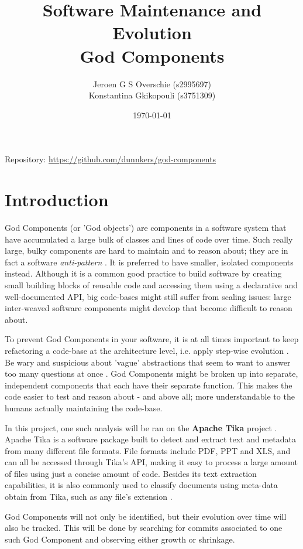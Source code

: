 \documentclass{article}
\title{Software Maintenance and Evolution \\God Components}
\author{Jeroen G S Overschie (s2995697)\\ Konstantina Gkikopouli (s3751309)}
\date{\today}
\begin{document}
\maketitle
Repository: \small{\url{https://github.com/dunnkers/god-components}}
\tableofcontents
\newpage

\section{Introduction}
God Components (or 'God objects') are components in a software system that have accumulated a large bulk of classes and lines of code over time. Such really large, bulky components are hard to maintain and to reason about; they are in fact a software \textit{anti-pattern} \citep{smith2000software}. It is preferred to have smaller, isolated components instead. Although it is a common good practice to build software by creating small building blocks of reusable code and accessing them using a declarative and well-documented API, big code-bases might still suffer from scaling issues: large inter-weaved software components might develop that become difficult to reason about.

To prevent God Components in your software, it is at all times important to keep refactoring a code-base at the architecture level, i.e. apply step-wise evolution \citep{toward_a_catalogue_of_architetural_bad_smells}. Be wary and suspicious about 'vague' abstractions that seem to want to answer too many questions at once \citep{riel1996object}. God Components might be broken up into separate, independent components that each have their separate function. This makes the code easier to test and reason about - and above all; more understandable to the humans actually maintaining the code-base.

In this project, one such analysis will be ran on the \textbf{Apache Tika} project \citep{apache_software_foundation_2020}. Apache Tika is a software package built to detect and extract text and metadata from many different file formats. File formats include PDF, PPT and XLS, and can all be accessed through Tika's API, making it easy to process a large amount of files using just a concise amount of code. Besides its text extraction capabilities, it is also commonly used to classify documents using meta-data obtain from Tika, such as any file's extension \citep{Tika}.

God Components will not only be identified, but their evolution over time will also be tracked. This will be done by searching for commits associated to one such God Component and observing either growth or shrinkage.
\end{document}
